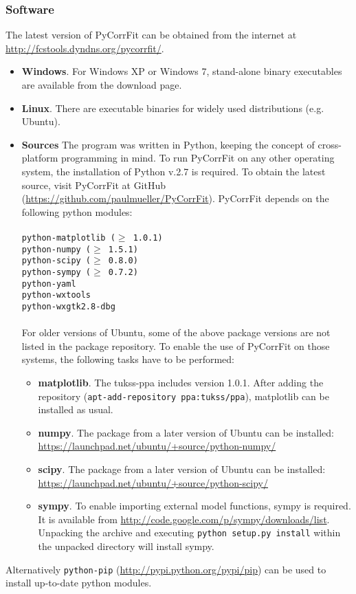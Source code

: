 \subsubsection{Software}
\label{cha:soft}
The latest version of PyCorrFit can be obtained from the internet at \url{http://fcstools.dyndns.org/pycorrfit/}.
\begin{itemize}
\item \textbf{Windows}.
For Windows XP or Windows 7, stand-alone binary executables are available from the download page. 
\item \textbf{Linux}.
There are executable binaries for widely used distributions (e.g. Ubuntu).
\item \textbf{Sources}
The program was written in Python, keeping the concept of cross-platform programming in mind. To run PyCorrFit on any other operating system, the installation of Python v.2.7 is required. To obtain the latest source, visit PyCorrFit at GitHub (\url{https://github.com/paulmueller/PyCorrFit}). PyCorrFit depends on the following python modules:\\
\texttt{\\
python-matplotlib ($\geq$ 1.0.1) \\
python-numpy ($\geq$ 1.5.1) \\
python-scipy ($\geq$ 0.8.0) \\
python-sympy ($\geq$ 0.7.2) \\
python-yaml \\
python-wxtools \\
python-wxgtk2.8-dbg \\
}
\\
For older versions of Ubuntu, some of the above package versions are not listed in the package repository. To enable the use of PyCorrFit on those systems, the following tasks have to be performed:
\begin{itemize}
\item[ ] \textbf{matplotlib}. The tukss-ppa includes version 1.0.1. After adding the repository (\texttt{apt-add-repository ppa:tukss/ppa}), matplotlib can be installed as usual.
\item[ ] \textbf{numpy}. The package from a later version of Ubuntu can be installed: \url{https://launchpad.net/ubuntu/+source/python-numpy/}
\item[ ] \textbf{scipy}. The package from a later version of Ubuntu can be installed: \url{https://launchpad.net/ubuntu/+source/python-scipy/}
\item[ ] \textbf{sympy}. To enable importing external model functions, sympy is required. It is available from \url{http://code.google.com/p/sympy/downloads/list}. Unpacking the archive and executing \texttt{python setup.py install} within the unpacked directory will install sympy.
\end{itemize}
\end{itemize}
Alternatively \texttt{python-pip} (\url{http://pypi.python.org/pypi/pip}) can be used to install up-to-date python modules.

